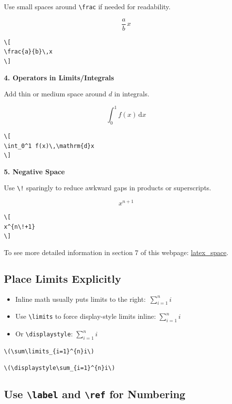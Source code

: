 \documentclass[12pt,a4paper]{article}
\begin{document}
Use small spaces around \verb|\frac| if needed for readability.

\[
\frac{a}{b}\,x
\]

\begin{verbatim}
\[
\frac{a}{b}\,x
\]
\end{verbatim}

\textbf{4. Operators in Limits/Integrals}

Add thin or medium space around $d$ in integrals.

\[
\int_0^1 f(x)\,\mathrm{d}x
\]

\begin{verbatim}
\[
\int_0^1 f(x)\,\mathrm{d}x
\]
\end{verbatim}

\textbf{5. Negative Space}

Use \verb|\!| sparingly to reduce awkward gaps in products or superscripts.

\[
x^{n\!+1}
\]

\begin{verbatim}
\[
x^{n\!+1}
\]
\end{verbatim}

To see more detailed information in section 7 of this webpage:
\href{https://latex-tutorial.com/latex-space/}{latex\_space}.

\subsection{Place Limits Explicitly}

\begin{itemize}
    \item Inline math usually puts limits to the right:\, \(\sum_{i=1}^{n}i\)
    
    \item Use \verb|\limits| to force display-style limits inline:
    \(\sum\limits_{i=1}^{n}i\)
    
    \item Or \verb|\displaystyle|:
    \(\displaystyle\sum_{i=1}^{n}i\)
\end{itemize}

\begin{verbatim}
\(\sum\limits_{i=1}^{n}i\)
\end{verbatim}

\begin{verbatim}
\(\displaystyle\sum_{i=1}^{n}i\)
\end{verbatim}

\subsection{Use \texttt{\textbackslash label} and \texttt{\textbackslash ref} for Numbering}
\end{document}
